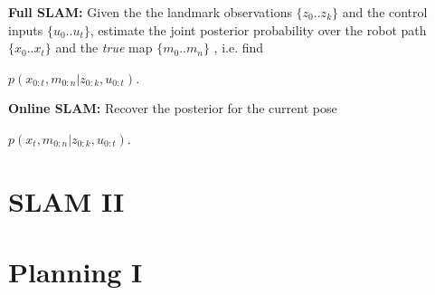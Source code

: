 \documentclass[landscape]{article}
\newcommand{\vmspace}{\vspace{-7pt}}
\newcommand{\vpspace}{\vspace{5pt}}
\begin{document}
\begin{multicols}{3}
\begin{minipage}{\columnwidth}
  \textbf{Full SLAM:} Given the the landmark observations $  \{z_0..z_k\}$ and
  the control inputs $\{u_0..u_t\}$, estimate the joint posterior
  probability over the robot path $\{x_0..x_t\}$ and the \textit{true} map
  $\{m_0..m_{n}\}$ , i.e. find
  \vmspace
  \begin{center}
    $
    p(x_{0:t}, m_{0:n}| z_{0:k}, u_{0:t}).
    $
  \end{center}
\end{minipage}

\vpspace


\begin{minipage}{\columnwidth}
  \textbf{Online SLAM:} Recover the posterior for the current pose
  \vmspace
  \begin{center}
    $
    p(x_{t}, m_{0:n}| z_{0:k}, u_{0:t}).
    $
  \end{center}
\end{minipage}

\vfill


\section{SLAM II}

\blindtext[3]


\vfill

\columnbreak

\section{Planning I}

\vmspace


\end{multicols}
\end{document}
